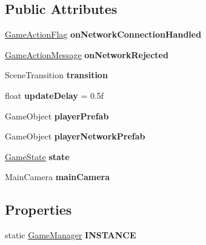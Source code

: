 \subsection*{Public Attributes}
\begin{DoxyCompactItemize}
\item 
\hypertarget{class_game_manager_a87d481fe88a1765f436ea5764cd1a21a}{\hyperlink{class_game_manager_1_1_game_action_flag}{Game\-Action\-Flag} {\bfseries on\-Network\-Connection\-Handled}}\label{class_game_manager_a87d481fe88a1765f436ea5764cd1a21a}

\item 
\hypertarget{class_game_manager_af977df043b83671ab9a4753b90fbf75b}{\hyperlink{class_game_manager_1_1_game_action_message}{Game\-Action\-Message} {\bfseries on\-Network\-Rejected}}\label{class_game_manager_af977df043b83671ab9a4753b90fbf75b}

\item 
\hypertarget{class_game_manager_abae15982d4eb90ef9e5f3d24d15e22f2}{Scene\-Transition {\bfseries transition}}\label{class_game_manager_abae15982d4eb90ef9e5f3d24d15e22f2}

\item 
\hypertarget{class_game_manager_a4783d964ba3d7bf89b0142286d745014}{float {\bfseries update\-Delay} = 0.\-5f}\label{class_game_manager_a4783d964ba3d7bf89b0142286d745014}

\item 
\hypertarget{class_game_manager_a57d400c7a28f42865048fbdbaf236cfb}{Game\-Object {\bfseries player\-Prefab}}\label{class_game_manager_a57d400c7a28f42865048fbdbaf236cfb}

\item 
\hypertarget{class_game_manager_aeca2fe86e0abba27ebac921e0fd193ab}{Game\-Object {\bfseries player\-Network\-Prefab}}\label{class_game_manager_aeca2fe86e0abba27ebac921e0fd193ab}

\item 
\hypertarget{class_game_manager_a8d86b330237462e38933b28276ed0e2c}{\hyperlink{class_game_state}{Game\-State} {\bfseries state}}\label{class_game_manager_a8d86b330237462e38933b28276ed0e2c}

\item 
\hypertarget{class_game_manager_aafd6b83529911d9e32cc4b79bd477d74}{Main\-Camera {\bfseries main\-Camera}}\label{class_game_manager_aafd6b83529911d9e32cc4b79bd477d74}

\end{DoxyCompactItemize}
\subsection*{Properties}
\begin{DoxyCompactItemize}
\item 
\hypertarget{class_game_manager_a5c1d1f77dd4a2668a47a75c934c87075}{static \hyperlink{class_game_manager}{Game\-Manager} {\bfseries I\-N\-S\-T\-A\-N\-C\-E}}\label{class_game_manager_a5c1d1f77dd4a2668a47a75c934c87075}

\end{DoxyCompactItemize}


